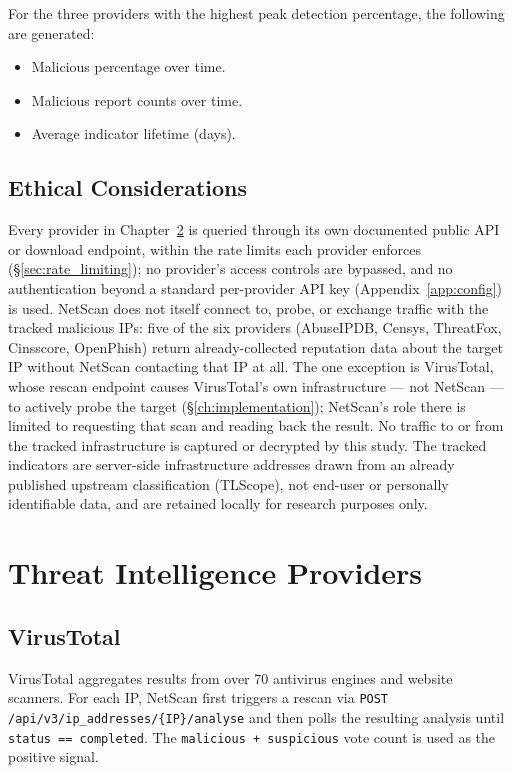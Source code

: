 \documentclass[12pt, a4paper, twoside]{report}
\begin{document}
For the three providers with the highest peak detection percentage, the following are generated:
\begin{itemize}
  \item Malicious percentage over time.
  \item Malicious report counts over time.
  \item Average indicator lifetime (days).
\end{itemize}

\section{Ethical Considerations}

Every provider in Chapter~\ref{ch:providers} is queried through its own documented public API or
download endpoint, within the rate limits each provider enforces (\S\ref{sec:rate_limiting}); no
provider's access controls are bypassed, and no authentication beyond a standard per-provider API
key (Appendix~\ref{app:config}) is used. NetScan does not itself connect to, probe, or exchange
traffic with the tracked malicious IPs: five of the six providers (AbuseIPDB, Censys, ThreatFox,
Cinsscore, OpenPhish) return already-collected reputation data about the target IP without NetScan
contacting that IP at all. The one exception is VirusTotal, whose rescan endpoint causes
VirusTotal's own infrastructure --- not NetScan --- to actively probe the target
(\S\ref{ch:implementation}); NetScan's role there is limited to requesting that scan and reading
back the result. No traffic to or from the tracked infrastructure is captured or decrypted by this
study. The tracked indicators are server-side infrastructure addresses drawn from an already
published upstream classification (TLScope), not end-user or personally identifiable data, and are
retained locally for research purposes only.

\chapter{Threat Intelligence Providers}
\label{ch:providers}

\section{VirusTotal}

VirusTotal aggregates results from over 70 antivirus engines and website scanners. For each IP,
NetScan first triggers a rescan via \texttt{POST /api/v3/ip\_addresses/\{IP\}/analyse} and then
polls the resulting analysis until \texttt{status == completed}. The \texttt{malicious +
suspicious} vote count is used as the positive signal.
\end{document}
